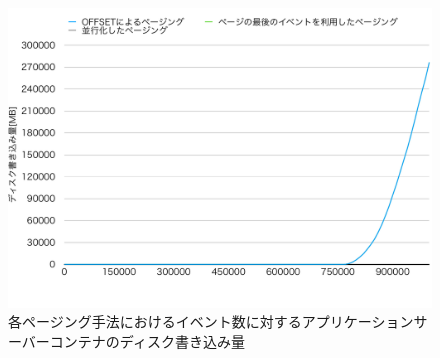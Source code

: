 \documentclass[../../../../../main]{subfiles}
\begin{document}
    \begin{figure}[H]
        \centering
        \includegraphics[width=12cm]{graph}
        \caption{各ページング手法におけるイベント数に対するアプリケーションサーバーコンテナのディスク書き込み量}
        \label{fig:each-paging-app-disk-in-app_1_1024-db_1_1024}
    \end{figure}
\end{document}
